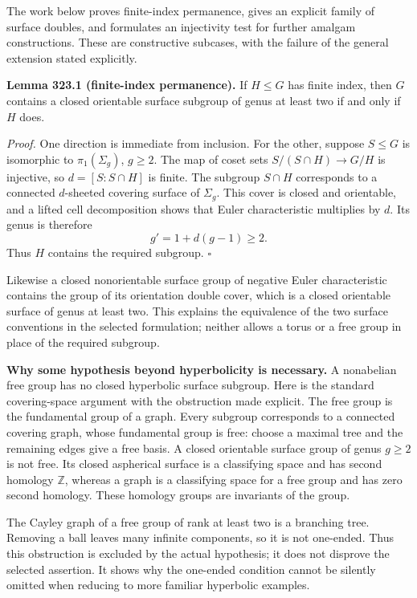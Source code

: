 \documentclass[11pt]{article}
\begin{document}
The work below proves finite-index permanence, gives an explicit family of surface doubles, and formulates an injectivity test for further amalgam constructions. These are constructive subcases, with the failure of the general extension stated explicitly.

\textbf{Lemma 323.1 (finite-index permanence).} If $H\leq G$ has finite index, then $G$ contains a closed orientable surface subgroup of genus at least two if and only if $H$ does.

\emph{Proof.} One direction is immediate from inclusion. For the other, suppose $S\leq G$ is isomorphic to $\pi_1(\Sigma_g)$, $g\geq2$. The map of coset sets $S/(S\cap H)\to G/H$ is injective, so $d=[S:S\cap H]$ is finite. The subgroup $S\cap H$ corresponds to a connected $d$-sheeted covering surface of $\Sigma_g$. This cover is closed and orientable, and a lifted cell decomposition shows that Euler characteristic multiplies by $d$. Its genus is therefore
\[
 g'=1+d(g-1)\geq2.
\]
Thus $H$ contains the required subgroup. $\square$

Likewise a closed nonorientable surface group of negative Euler characteristic contains the group of its orientation double cover, which is a closed orientable surface of genus at least two. This explains the equivalence of the two surface conventions in the selected formulation; neither allows a torus or a free group in place of the required subgroup.

\textbf{Why some hypothesis beyond hyperbolicity is necessary.} A nonabelian free group has no closed hyperbolic surface subgroup. Here is the standard covering-space argument with the obstruction made explicit. The free group is the fundamental group of a graph. Every subgroup corresponds to a connected covering graph, whose fundamental group is free: choose a maximal tree and the remaining edges give a free basis. A closed orientable surface group of genus $g\geq2$ is not free. Its closed aspherical surface is a classifying space and has second homology $\mathbb Z$, whereas a graph is a classifying space for a free group and has zero second homology. These homology groups are invariants of the group.

The Cayley graph of a free group of rank at least two is a branching tree. Removing a ball leaves many infinite components, so it is not one-ended. Thus this obstruction is excluded by the actual hypothesis; it does not disprove the selected assertion. It shows why the one-ended condition cannot be silently omitted when reducing to more familiar hyperbolic examples.
\end{document}
